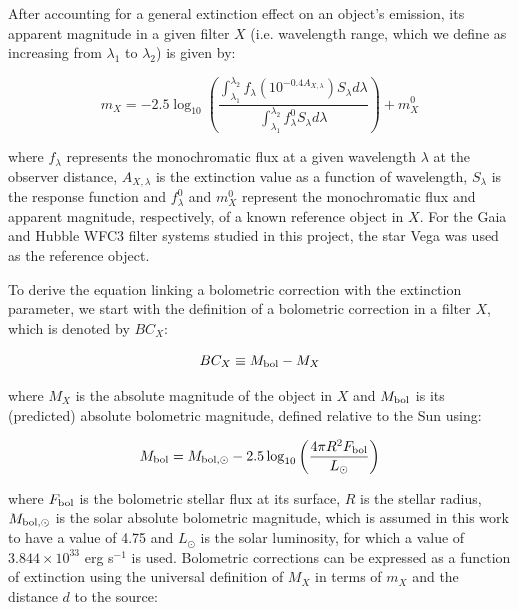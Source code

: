 \documentclass[12pt, a4paper]{report}
\begin{document}
After accounting for a general extinction effect on an object's emission, its apparent magnitude in a given filter $X$ (i.e. wavelength range, which we define as increasing from $\lambda _{1}$ to $\lambda _{2}$) is given by:

\begin{equation}
m_{X} = -2.5 \log_{10} \left(\frac{ \int_{\lambda_{1}}^{\lambda_{2}} f_{\lambda} \left( 10^{-0.4 A_{X,\lambda}} \right) S_{\lambda} d\lambda }{ \int_{\lambda_{1}}^{\lambda_{2}} f_{\lambda}^{0} S_{\lambda} d\lambda }\right) + m_{X}^{0}
\label{app_mag_def}
\end{equation}

where $f_{\lambda}$ represents the monochromatic flux at a given wavelength $\lambda$ at the observer distance, $A_{X,\lambda}$ is the extinction value as a function of wavelength, $S_{\lambda}$ is the response function and $f_{\lambda}^{0}$ and $m_{X}^{0}$ represent the monochromatic flux and apparent magnitude, respectively, of a known reference object in $X$. For the Gaia and Hubble WFC3 filter systems studied in this project, the star Vega was used as the reference object.


To derive the equation linking a bolometric correction with the extinction parameter, we start with the definition of a bolometric correction in a filter $X$, which is denoted by $BC_{X}$:

\begin{equation}
BC_{X} \equiv M_{\textnormal{bol}} - M_{X}
\label{BC_def}
\end{equation}

where $M_{X}$ is the absolute magnitude of the object in $X$ and $M_{\textnormal{bol}}$ is its (predicted) absolute bolometric magnitude, defined relative to the Sun using:

\begin{equation}
M_{\textnormal{bol}} = M_{\textnormal{bol},\odot} - 2.5 \log_{10} \left( \frac{4\pi R^{2}F_{\textnormal{bol}}}{L_{\odot}} \right)
\label{mbol_sun}
\end{equation}

where  $F_{\textnormal{bol}}$ is the bolometric stellar flux at its surface, $R$ is the stellar radius, $M_{\textnormal{bol},\odot}$ is the solar absolute bolometric magnitude, which is assumed in this work to have a value of 4.75 and $L_{\odot}$ is the solar luminosity, for which a value of $3.844 \times 10^{33}$ erg s$^{-1}$ is used. Bolometric corrections can be expressed as a function of extinction using the universal definition of $M_{X}$ in terms of $m_{X}$ and the distance $d$ to the source:
\end{document}
